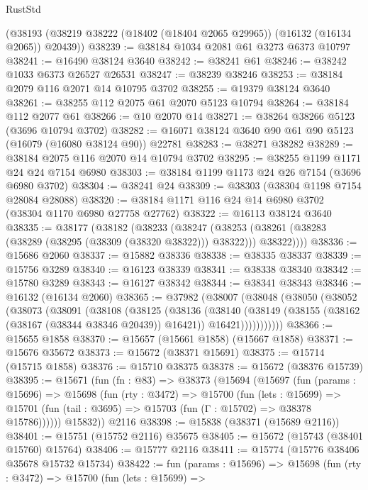 \begin{lexlean}{RustStd}
\begin{coremodule}
    (@38193 (@38219 @38222 (@18402 (@18404 @2065 @29965)) (@16132 (@16134 @2065)) @20439))
@38239 := @38184 @1034 @2081 @61 @3273 @6373 @10797
@38241 := @16490 @38124 @3640
@38242 := @38241 @61
@38246 := @38242 @1033 @6373 @26527 @26531
@38247 := @38239 @38246
@38253 := @38184 @2079 @116 @2071 @14 @10795 @3702
@38255 := @19379 @38124 @3640
@38261 := @38255 @112 @2075 @61 @2070 @5123 @10794
@38264 := @38184 @112 @2077 @61
@38266 := @10 @2070 @14
@38271 := @38264 @38266 @5123 (@3696 @10794 @3702)
@38282 := @16071 @38124 @3640 @90 @61 @90 @5123 (@16079 (@16080 @38124 @90)) @22781
@38283 := @38271 @38282
@38289 := @38184 @2075 @116 @2070 @14 @10794 @3702
@38295 := @38255 @1199 @1171 @24 @24 @7154 @6980
@38303 := @38184 @1199 @1173 @24 @26 @7154 (@3696 @6980 @3702)
@38304 := @38241 @24
@38309 := @38303 (@38304 @1198 @7154 @28084 @28088)
@38320 := @38184 @1171 @116 @24 @14 @6980 @3702 (@38304 @1170 @6980 @27758 @27762)
@38322 := @16113 @38124 @3640
@38335 := @38177
    (@38182
      (@38233
        (@38247
          (@38253 (@38261 (@38283 (@38289 (@38295 (@38309 (@38320 @38322))) @38322))) @38322))))
@38336 := @15686 @2060
@38337 := @15882 @38336
@38338 := @38335 @38337
@38339 := @15756 @3289
@38340 := @16123 @38339
@38341 := @38338 @38340
@38342 := @15780 @3289
@38343 := @16127 @38342
@38344 := @38341 @38343
@38346 := @16132 (@16134 @2060)
@38365 := @37982
    (@38007
      (@38048
        (@38050
          (@38052
            (@38073
              (@38091
                (@38108
                  (@38125
                    (@38136
                      (@38140
                        (@38149
                          (@38155 (@38162 (@38167 (@38344 @38346 @20439)) @16421))
                          @16421)))))))))))
@38366 := @15655 @1858
@38370 := @15657 (@15661 @1858) (@15667 @1858)
@38371 := @15676 @35672
@38373 := @15672 (@38371 @15691)
@38375 := @15714 (@15715 @1858)
@38376 := @15710 @38375
@38378 := @15672 (@38376 @15739)
@38395 := @15671
    (fun (fn : @83) =>
    @38373
      (@15694
        (@15697
          (fun (params : @15696) =>
          @15698
            (fun (rty : @3472) =>
            @15700
              (fun (lets : @15699) =>
              @15701 (fun (tail : @3695) => @15703 (fun (Γ : @15702) => @38378 @15786))))))
        @15832))
    @2116
@38398 := @15838 (@38371 (@15689 @2116))
@38401 := @15751 (@15752 @2116) @35675
@38405 := @15672 (@15743 (@38401 @15760) @15764)
@38406 := @15777 @2116
@38411 := @15774 (@15776 @38406 @35678 @15732 @15734)
@38422 := fun (params : @15696) =>
  @15698
    (fun (rty : @3472) =>
    @15700
      (fun (lets : @15699) =>

\end{coremodule}
\end{lexlean}
